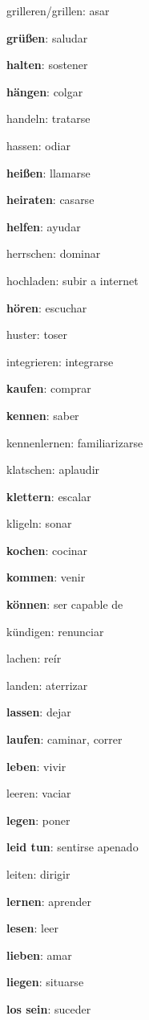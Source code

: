 \begin{multicols}{2}
\begin{myitemize}
\item grilleren/grillen: asar
\item \textbf{grüßen}: saludar
\item \textbf{halten}: sostener
\item \textbf{hängen}: colgar
\item handeln: tratarse
\item hassen: odiar
\item \textbf{heißen}: llamarse
\item \textbf{heiraten}: casarse
\item \textbf{helfen}: ayudar
\item herrschen: dominar
\item hochladen: subir a internet
\item \textbf{hören}: escuchar
\item huster: toser
\item integrieren: integrarse
\item \textbf{kaufen}: comprar
\item \textbf{kennen}: saber
\item kennenlernen: familiarizarse
\item klatschen: aplaudir
\item \textbf{klettern}: escalar
\item kligeln: sonar
\item \textbf{kochen}: cocinar
\item \textbf{kommen}: venir
\item \textbf{können}: ser capable de
\item kündigen: renunciar
\item lachen: reír
\item landen: aterrizar
\item \textbf{lassen}: dejar
\item \textbf{laufen}: caminar, correr
\item \textbf{leben}: vivir
\item leeren: vaciar
\item \textbf{legen}: poner
\item \textbf{leid tun}: sentirse apenado
\item leiten: dirigir
\item \textbf{lernen}: aprender
\item \textbf{lesen}: leer
\item \textbf{lieben}: amar
\item \textbf{liegen}: situarse
\item \textbf{los sein}: suceder

\end{myitemize}
\end{multicols}
